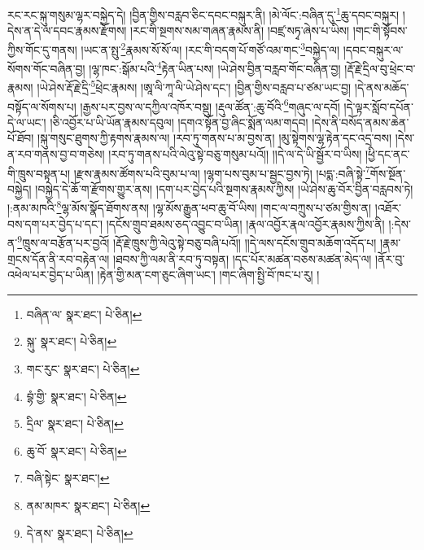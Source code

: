 རང་རང་སྐུ་གསུམ་ལྷར་བསྐྱེད་དེ། །བྱིན་གྱིས་བརླབ་ཅིང་དབང་བསྐུར་ནི། །མེ་ལོང་:བཞིན་དུ་\footnote{བཞིན་ལ་  སྣར་ཐང་།  པེ་ཅིན། }ཆུ་དབང་བསྐུར། །དེས་ན་དེ་ལ་དབང་རྣམས་རྫོགས། །རང་གི་སྔགས་སམ་གཞན་རྣམས་ནི། །བཛྲ་སཏྭ་ཞེས་པ་ཡིས། །གང་གི་སྟོབས་ཀྱིས་གོང་དུ་གནས། །ཡང་ན་སྤུ་\footnote{སྐུ་  སྣར་ཐང་།  པེ་ཅིན། }རྣམས་སོ་སོ་ལ། །རང་གི་བདག་པོ་གཙོ་འམ་གང་\footnote{གང་རུང་  སྣར་ཐང་།  པེ་ཅིན། }བསྐྱེད་ལ། །དབང་བསྐུར་ལ་སོགས་གོང་བཞིན་བྱ། །ལྷ་ཁང་:སྒོམ་པའི་\footnote{བྷཾ་གྱི་  སྣར་ཐང་།  པེ་ཅིན། }རྟེན་ཡིན་པས། །ཡེ་ཤེས་བྱིན་བརླབ་གོང་བཞིན་བྱ། །རྡོ་རྗེ་དྲིལ་བུ་ཕྲེང་བ་རྣམས། །ཡེ་ཤེས་རྡོ་རྗེ་དྲི་\footnote{དྲིལ་  སྣར་ཐང་།  པེ་ཅིན། }ཕྲེང་རྣམས། །ཨཱ་ལི་ཀཱ་ལི་ཡེ་ཤེས་དང་། །བྱིན་གྱིས་བརླབ་པ་ཙམ་ཡང་བྱ། །དེ་ནས་མཆོད་བསྟོད་ལ་སོགས་པ། །རྒྱས་པར་བྱས་ལ་དཀྱིལ་འཁོར་བསྡུ། །རྡུལ་ཚོན་:ཆུ་བོའི་\footnote{ཆུ་བོ་  སྣར་ཐང་།  པེ་ཅིན། }གཞུང་ལ་དབོ། །དེ་ལྟར་སློབ་དཔོན་དེ་ལ་ཡང་། །ཅི་འབྱོར་པ་ཡི་ཡོན་རྣམས་དབུལ། །དགའ་སྟོན་བྱ་ཞིང་སྨོན་ལམ་གདབ། །དེས་ནི་བསོད་ནམས་ཆེན་པོ་ཐོབ། །སྐུ་གསུང་ཐུགས་ཀྱི་རྟགས་རྣམས་ལ། །རབ་ཏུ་གནས་པ་མ་བྱས་ན། །མུ་སྟེགས་ལྷ་རྟེན་དང་འདྲ་བས། །དེས་ན་རབ་གནས་བྱ་བ་གཅེས། །རབ་ཏུ་གནས་པའི་ལེའུ་སྟེ་བཅུ་གསུམ་པའོ།། །།དེ་ལ་དེ་ཡི་སྦྱོར་བ་ཡིས། །ཕྱི་དང་ནང་གི་ཁྲུས་བསྟན་པ། །རྫས་རྣམས་ཚོགས་པའི་བུམ་པ་ལ། །ལྷག་པས་བུམ་པ་སྦྱང་བྱས་ཏེ། །པདྨ་:བཞི་སྟེ་\footnote{བཞི་སྟེང་  སྣར་ཐང་། }གོས་སྔོན་བསྐྱེད། །བསྐྱེད་དེ་ཆོ་ག་རྫོགས་གྱུར་ནས། །དག་པར་བྱེད་པའི་སྔགས་རྣམས་ཀྱིས། །ཡེ་ཤེས་ཆུ་བོར་བྱིན་བརླབས་ཏེ། །:ནམ་མཁའི་\footnote{ནམ་མཁར་  སྣར་ཐང་།  པེ་ཅིན། }ལྷ་མོས་སྣོད་ཐོགས་ནས། །ལྷ་མོས་རྒྱུན་ཕབ་ཆུ་བོ་ཡིས། །གང་ལ་བཀྲུས་པ་ཙམ་གྱིས་ན། །འཐོར་བས་དག་པར་བྱེད་པ་དང་། །དངོས་གྲུབ་ཐམས་ཅད་འབྱུང་བ་ཡིན། །རྣལ་འབྱོར་རྣལ་འབྱོར་རྣམས་ཀྱིས་ནི། །:དེས་ན་\footnote{དེ་ནས་  སྣར་ཐང་།  པེ་ཅིན། }ཁྲུས་ལ་བརྩོན་པར་བྱའོ། །རྡོ་རྗེ་ཁྲུས་ཀྱི་ལེའུ་སྟེ་བཅུ་བཞི་པའོ།། །།དེ་ལས་དངོས་གྲུབ་མཆོག་འདོད་པ། །རྣམ་གྲངས་དོན་ནི་རབ་བརྟེན་ལ། །ཐབས་ཀྱི་ལམ་ནི་རབ་ཏུ་བསྟན། །དང་པོར་མཚན་བཅས་མཚན་མེད་ལ། །ནོར་བུ་འཕེལ་པར་བྱེད་པ་ཡིན། །རྟེན་གྱི་མན་ངག་ཅུང་ཞིག་ཡང་། །གང་ཞིག་སྤྱི་བོ་ཁང་པ་རུ། །
